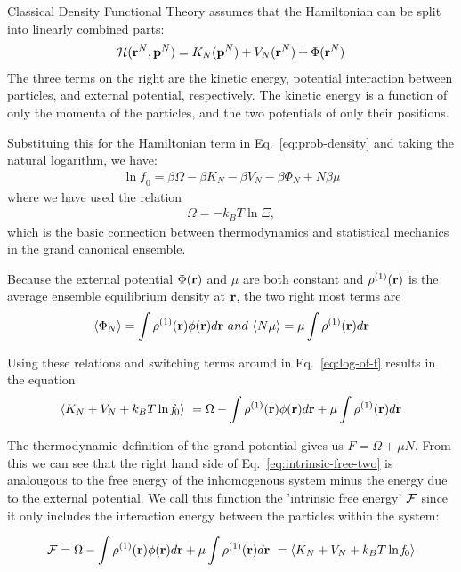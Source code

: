 Classical Density Functional Theory assumes that the Hamiltonian can
be split into linearly combined parts:
\begin{align}\label{eq:hamiltonian}
  \mathcal{H}(\textbf{r}^N,\mathbf{p}^N) = K_N(\mathbf{p}^N) + V_N(\textbf{r}^N) + \Phi(\textbf{r}^N)
\end{align}
The three terms on the right are the kinetic energy, potential
interaction between particles, and external potential, respectively.
The kinetic energy is a function of only the momenta of the particles,
and the two potentials of only their positions.

Substituing this for the Hamiltonian term in Eq.~\ref{eq:prob-density}
and taking the natural logarithm, we have:
\begin{align}
  \label{eq:log-of-f}
  \ln \mathit{f}_0 = \beta\Omega - \beta K_N - \beta V_N - \beta \Phi_N + N\beta \mu
\end{align}
where we have used the relation
\begin{align}
  \Omega = -k_BT\ln\Xi,
\end{align}
which is the basic connection between thermodynamics and statistical
mechanics in the grand canonical ensemble.

Because the external potential $\Phi(\textbf{r})$ and $\mu$ are both constant
and $\rho^{(1)}(\textbf{r})$ is the average ensemble equilibrium density at
$\textbf{r}$, the two right most terms are
\begin{align}
  \langle \Phi_N \rangle = \int \rho^{(1)}(\textbf{r})\phi(\textbf{r})d\textbf{r} \
  and \
  \langle N\mu \rangle = \mu \int \rho^{(1)}(\textbf{r}) d\textbf{r}
\end{align}

Using these relations and switching terms around in
Eq.~\ref{eq:log-of-f} results in the equation
\begin{align} \label{eq:intrinsic-free-two}
  \langle K_N + V_N + k_BT \ln \mathit{f}_0 \rangle \
  = \Omega - \int \rho^{(1)}(\textbf{r})\phi(\textbf{r})d\textbf{r} + \mu \int \rho^{(1)}(\textbf{r})d\textbf{r}
\end{align}

The thermodynamic definition of the grand potential gives us $F =
\Omega + \mu N$.  From this we can see that the right hand side of
Eq.~\ref{eq:intrinsic-free-two} is analougous to the free energy of
the inhomogenous system minus the energy due to the external
potential.  We call this function the 'intrinsic free energy' $\mathcal{F}$
since it only includes the interaction energy between the particles
within the system:

\begin{align}
  \label{eq:intrinsic-free-three}
  \mathcal{F} = \Omega - \int \rho^{(1)}(\textbf{r})\phi(\textbf{r})d\textbf{r} + \mu \int \rho^{(1)}(\textbf{r})d\textbf{r} \
  = \langle K_N + V_N + k_BT \ln \mathit{f}_0 \rangle
\end{align}

